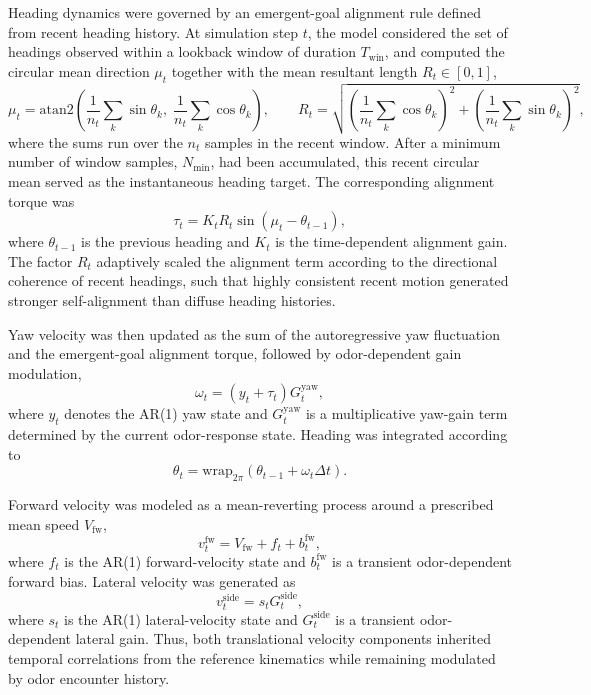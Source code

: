 Heading dynamics were governed by an emergent-goal alignment rule defined from recent heading history. At simulation step \(t\), the model considered the set of headings observed within a lookback window of duration \(T_{\mathrm{win}}\), and computed the circular mean direction \(\mu_t\) together with the mean resultant length \(R_t \in [0,1]\),
\[
\mu_t = \mathrm{atan2}\!\left(\frac{1}{n_t}\sum_{k}\sin\theta_k,\;\frac{1}{n_t}\sum_{k}\cos\theta_k\right),
\qquad
R_t = \sqrt{\left(\frac{1}{n_t}\sum_{k}\cos\theta_k\right)^2+\left(\frac{1}{n_t}\sum_{k}\sin\theta_k\right)^2},
\]
where the sums run over the \(n_t\) samples in the recent window. After a minimum number of window samples, \(N_{\min}\), had been accumulated, this recent circular mean served as the instantaneous heading target. The corresponding alignment torque was
\[
\tau_t = K_t R_t \sin(\mu_t-\theta_{t-1}),
\]
where \(\theta_{t-1}\) is the previous heading and \(K_t\) is the time-dependent alignment gain. The factor \(R_t\) adaptively scaled the alignment term according to the directional coherence of recent headings, such that highly consistent recent motion generated stronger self-alignment than diffuse heading histories.

Yaw velocity was then updated as the sum of the autoregressive yaw fluctuation and the emergent-goal alignment torque, followed by odor-dependent gain modulation,
\[
\omega_t = \left(y_t + \tau_t\right) G^{\mathrm{yaw}}_t,
\]
where \(y_t\) denotes the AR(1) yaw state and \(G^{\mathrm{yaw}}_t\) is a multiplicative yaw-gain term determined by the current odor-response state. Heading was integrated according to
\[
\theta_t = \mathrm{wrap}_{2\pi}\!\left(\theta_{t-1} + \omega_t \Delta t\right).
\]

Forward velocity was modeled as a mean-reverting process around a prescribed mean speed \(V_{\mathrm{fw}}\),
\[
v^{\mathrm{fw}}_t = V_{\mathrm{fw}} + f_t + b^{\mathrm{fw}}_t,
\]
where \(f_t\) is the AR(1) forward-velocity state and \(b^{\mathrm{fw}}_t\) is a transient odor-dependent forward bias. Lateral velocity was generated as
\[
v^{\mathrm{side}}_t = s_t G^{\mathrm{side}}_t,
\]
where \(s_t\) is the AR(1) lateral-velocity state and \(G^{\mathrm{side}}_t\) is a transient odor-dependent lateral gain. Thus, both translational velocity components inherited temporal correlations from the reference kinematics while remaining modulated by odor encounter history.

